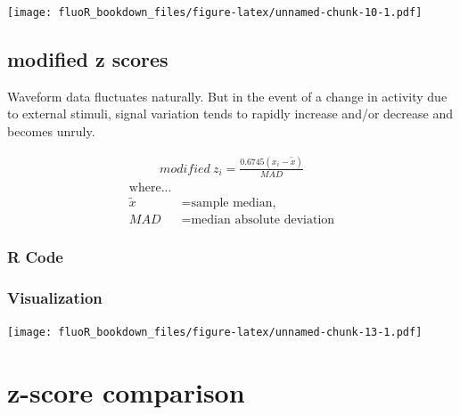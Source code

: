 \documentclass[
]{book}
\newenvironment{Shaded}{\begin{snugshade}}{\end{snugshade}}
\newcommand{\DataTypeTok}[1]{\textcolor[rgb]{0.13,0.29,0.53}{#1}}
\newcommand{\KeywordTok}[1]{\textcolor[rgb]{0.13,0.29,0.53}{\textbf{#1}}}
\newcommand{\NormalTok}[1]{#1}
\newcommand{\OperatorTok}[1]{\textcolor[rgb]{0.81,0.36,0.00}{\textbf{#1}}}
\newcommand{\StringTok}[1]{\textcolor[rgb]{0.31,0.60,0.02}{#1}}
\begin{document}
\texttt{[image: fluoR\_bookdown\_files/figure-latex/unnamed-chunk-10-1.pdf]}

\hypertarget{stand-methods-mzscore}{%
\subsection{modified z scores}\label{stand-methods-mzscore}}

Waveform data fluctuates naturally. But in the event of a change in activity due to external stimuli, signal variation tends to rapidly increase and/or decrease and becomes unruly.

\begin{gather*}
  modified \ z_{i} = \frac{0.6745(x_{i}-\widetilde{x})}{MAD}
\end{gather*}
\begin{align*}
  \text{where...} \\
  \widetilde{x} &= \text{sample median,} \\
  {MAD} &= \text{median absolute deviation}
\end{align*}

\hypertarget{stand-methods-mzscore-code}{%
\subsubsection{R Code}\label{stand-methods-mzscore-code}}

\begin{Shaded}
\end{Shaded}

\hypertarget{stand-methods-mzscore-vis}{%
\subsubsection{Visualization}\label{stand-methods-mzscore-vis}}

\texttt{[image: fluoR\_bookdown\_files/figure-latex/unnamed-chunk-13-1.pdf]}

\hypertarget{stand-comparison}{%
\section{z-score comparison}\label{stand-comparison}}
\end{document}
